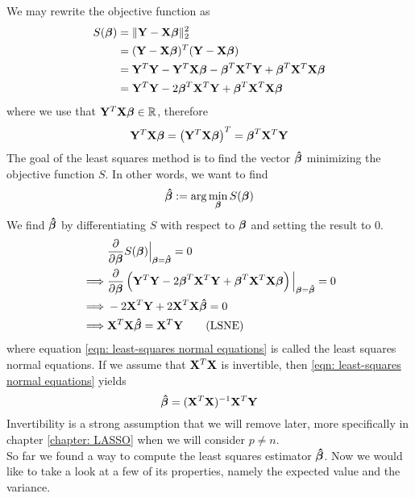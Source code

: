 We may rewrite the objective function as
\begin{align*}
    S(\boldsymbol{\beta})
     & = \| \mathbf{Y}-\mathbf{X} \boldsymbol{\beta} \|_2^2                                          \\
     & = (\mathbf{Y} - \mathbf{X} \boldsymbol{\beta})^{T} (\mathbf{Y} - \mathbf{X} \boldsymbol{\beta})                             \\
     & = \mathbf{Y}^T \mathbf{Y} - \mathbf{Y}^T \mathbf{X} \boldsymbol{\beta} - \boldsymbol{\beta}^T \mathbf{X}^T \mathbf{Y} + \boldsymbol{\beta}^T \mathbf{X}^T \mathbf{X} \boldsymbol{\beta} \\
     & = \mathbf{Y}^T \mathbf{Y} - 2 \boldsymbol{\beta}^T \mathbf{X}^T \mathbf{Y} + \boldsymbol{\beta}^T \mathbf{X}^T \mathbf{X} \boldsymbol{\beta}              \\
\end{align*}
where we use that \(\mathbf{Y}^T \mathbf{X} \boldsymbol{\beta} \in \mathbb{R}\), therefore
\[
    \mathbf{Y}^T \mathbf{X} \boldsymbol{\beta} = \left(\mathbf{Y}^T \mathbf{X} \boldsymbol{\beta}\right)^T = \boldsymbol{\beta}^T \mathbf{X}^T \mathbf{Y}
\]
The goal of the least squares method is to find the vector $\boldsymbol{\hat{\beta}}$ minimizing the objective function \( S \). In other words, we want to find
\[
    \boldsymbol{\hat{\beta}} := \arg \min_{\boldsymbol{\beta}} S(\boldsymbol{\beta})
\]
We find \( \boldsymbol{\hat{\beta}} \) by differentiating \( S \) with respect to $\boldsymbol{\beta}$ and setting the result to 0.
\begin{align}
             & \frac{\partial}{\partial \boldsymbol{\beta}} S(\boldsymbol{\beta}) \Big|_{\boldsymbol{\beta} = \boldsymbol{\hat{\beta}}} = 0 \nonumber                                                        \\
    \implies & \frac{\partial}{\partial \boldsymbol{\beta}} \left( \mathbf{Y}^T \mathbf{Y} - 2 \boldsymbol{\beta}^T \mathbf{X}^T \mathbf{Y} + \boldsymbol{\beta}^T \mathbf{X}^T \mathbf{X} \boldsymbol{\beta} \right)\Big|_{\boldsymbol{\beta} = \boldsymbol{\hat{\beta}}} = 0 \nonumber \\
    \implies & - 2 \mathbf{X}^T \mathbf{Y} + 2 \mathbf{X}^T \mathbf{X} \boldsymbol{\hat{\beta}} = 0 \nonumber                                                                                      \\
    \implies & \mathbf{X}^T \mathbf{X} \boldsymbol{\hat{\beta}} = \mathbf{X}^T \mathbf{Y} \label{eqn: least-squares normal equations} \tag{LSNE}
\end{align}
where equation \eqref{eqn: least-squares normal equations} is called the least squares normal equations. If we assume that \( \mathbf{X}^T \mathbf{X} \) is invertible, then \eqref{eqn: least-squares normal equations} yields
\begin{equation}
    \label{eqn: least squares estimator}
    \boldsymbol{\hat{\beta}} = (\mathbf{X}^T \mathbf{X})^{-1} \mathbf{X}^T \mathbf{Y}
\end{equation}
Invertibility is a strong assumption that we will remove later, more specifically in chapter \ref{chapter: LASSO} when we will consider \(p \neq n\). \\
So far we found a way to compute the least squares estimator \(\boldsymbol{\hat{\beta}}\). Now we would like to take a look at a few of its properties, namely the expected value and the variance. \\
